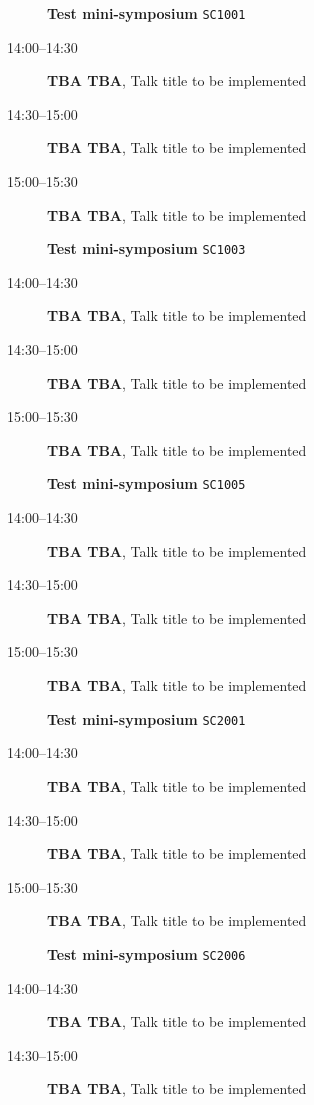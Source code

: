 \documentclass[ILAS2025-program.tex]{subfiles}
\begin{document}
\begin{description}
\begin{description}
    \item[] \textbf{Test mini-symposium} {\footnotesize\texttt{SC1001}}
    \item[14:00--14:30] \textbf{TBA TBA}, Talk title to be implemented
        \item[14:30--15:00] \textbf{TBA TBA}, Talk title to be implemented
        \item[15:00--15:30] \textbf{TBA TBA}, Talk title to be implemented
        \end{description}
    \begin{description}
    \item[] \textbf{Test mini-symposium} {\footnotesize\texttt{SC1003}}
    \item[14:00--14:30] \textbf{TBA TBA}, Talk title to be implemented
        \item[14:30--15:00] \textbf{TBA TBA}, Talk title to be implemented
        \item[15:00--15:30] \textbf{TBA TBA}, Talk title to be implemented
        \end{description}
    \begin{description}
    \item[] \textbf{Test mini-symposium} {\footnotesize\texttt{SC1005}}
    \item[14:00--14:30] \textbf{TBA TBA}, Talk title to be implemented
        \item[14:30--15:00] \textbf{TBA TBA}, Talk title to be implemented
        \item[15:00--15:30] \textbf{TBA TBA}, Talk title to be implemented
        \end{description}
    \begin{description}
    \item[] \textbf{Test mini-symposium} {\footnotesize\texttt{SC2001}}
    \item[14:00--14:30] \textbf{TBA TBA}, Talk title to be implemented
        \item[14:30--15:00] \textbf{TBA TBA}, Talk title to be implemented
        \item[15:00--15:30] \textbf{TBA TBA}, Talk title to be implemented
        \end{description}
    \begin{description}
    \item[] \textbf{Test mini-symposium} {\footnotesize\texttt{SC2006}}
    \item[14:00--14:30] \textbf{TBA TBA}, Talk title to be implemented
        \item[14:30--15:00] \textbf{TBA TBA}, Talk title to be implemented

\end{description}
\end{description}
\end{document}
